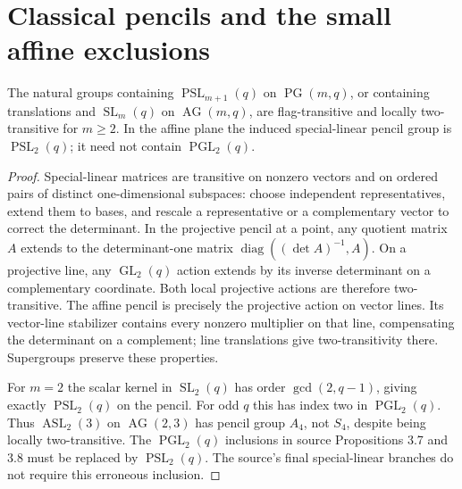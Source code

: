 \section{Classical pencils and the small affine exclusions}
\begin{proposition}\label{classical}
The natural groups containing $\operatorname{PSL}_{m+1}(q)$ on
$\operatorname{PG}(m,q)$, or containing translations and
$\operatorname{SL}_m(q)$ on $\operatorname{AG}(m,q)$, are flag-transitive
and locally two-transitive for $m\ge2$. In the affine plane the induced
special-linear pencil group is $\operatorname{PSL}_2(q)$; it need not
contain $\operatorname{PGL}_2(q)$.
\end{proposition}
\begin{proof}
Special-linear matrices are transitive on nonzero vectors and on ordered
pairs of distinct one-dimensional subspaces: choose independent
representatives, extend them to bases, and rescale a representative or a
complementary vector to correct the determinant. In the projective pencil
at a point, any quotient matrix $A$ extends to the determinant-one matrix
$\operatorname{diag}((\det A)^{-1},A)$. On a projective line, any
$\operatorname{GL}_2(q)$ action extends by its inverse determinant on a
complementary coordinate. Both local projective actions are therefore
two-transitive. The affine pencil is precisely the projective action
on vector lines. Its vector-line stabilizer contains every nonzero
multiplier on that line, compensating the determinant on a complement;
line translations give two-transitivity there. Supergroups preserve these
properties.

For $m=2$ the scalar kernel in $\operatorname{SL}_2(q)$ has order
$\gcd(2,q-1)$, giving exactly $\operatorname{PSL}_2(q)$ on the pencil.
For odd $q$ this has index two in $\operatorname{PGL}_2(q)$.
Thus $\operatorname{ASL}_2(3)$ on $\operatorname{AG}(2,3)$ has pencil
group $A_4$, not $S_4$, despite being locally two-transitive. The
$\operatorname{PGL}_2(q)$ inclusions in source Propositions 3.7 and 3.8
must be replaced by $\operatorname{PSL}_2(q)$. The source's final
special-linear branches do not require this erroneous inclusion.
\end{proof}

